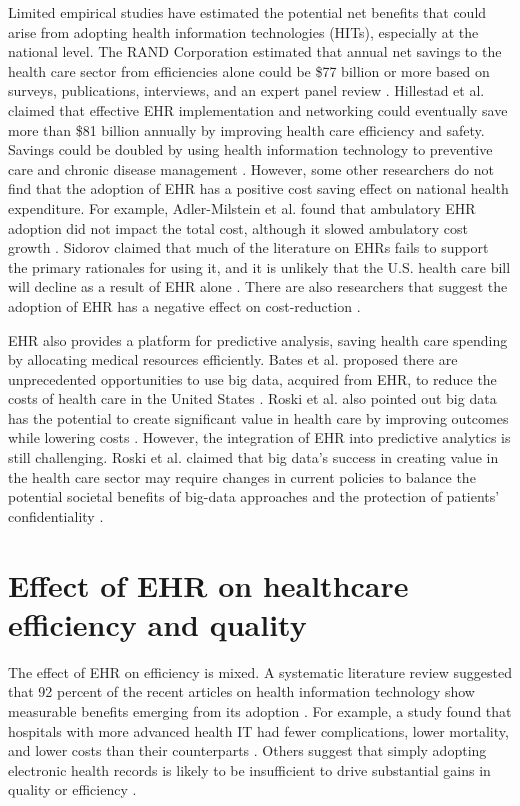 \documentclass[12pt]{report}
\begin{document}
Limited empirical studies have estimated the potential net benefits that could arise from adopting health information technologies (HITs), especially at the national level. The RAND Corporation estimated that annual net savings to the health care sector from efficiencies alone could be \$77 billion or more based on surveys, publications, interviews, and an expert panel review \citep{Rand2005}. Hillestad et al. claimed that effective EHR implementation and networking could eventually save more than \$81 billion annually by improving health care efficiency and safety. Savings could be doubled by using health information technology to preventive care and chronic disease management \citep{Hillestad2005}. However, some other researchers do not find that the adoption of EHR has a positive cost saving effect on national health expenditure. For example, Adler-Milstein et al. found that ambulatory EHR adoption did not impact the total cost, although it slowed ambulatory cost growth \citep{Adler-Milstein2013}. Sidorov claimed that much of the literature on EHRs fails to support the primary rationales for using it, and it is unlikely that the U.S. health care bill will decline as a result of EHR alone \citep{Sidorov2006}. There are also researchers that suggest the adoption of EHR has a negative effect on cost-reduction  \citep{Teufel2012}.

EHR also provides a platform for predictive analysis, saving health care spending by allocating medical resources efficiently. Bates et al. proposed there are unprecedented opportunities to use big data, acquired from EHR, to reduce the costs of health care in the United States \citep{Bates2014}. Roski et al. also pointed out big data has the potential to create significant value in health care by improving outcomes while lowering costs \citep{Roski2014}. However, the integration of EHR into predictive analytics is still challenging. Roski et al. claimed that big data's success in creating value in the health care sector may require changes in current policies to balance the potential societal benefits of big-data approaches and the protection of patients' confidentiality \citep{Roski2014}.

\section{Effect of EHR on healthcare efficiency and quality}

The effect of EHR on efficiency is mixed. A systematic literature review suggested that 92 percent of the recent articles on health information technology show measurable benefits emerging from its adoption \citep{Buntin2011}. For example, a study found that hospitals with more advanced health IT had fewer complications, lower mortality, and lower costs than their counterparts \citep{amarasingham2009clinical}. Others suggest that simply adopting electronic health records is likely to be insufficient to drive substantial gains in quality or efficiency \citep{DesRoches2010}. 
\end{document}
